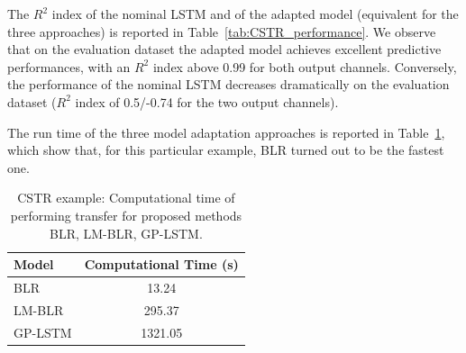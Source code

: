 \documentclass{article}
\begin{document}
 The $R^2$ index of the nominal LSTM and of the adapted model (equivalent for the three approaches) is reported in Table~\ref{tab:CSTR_performance}. We observe that on the evaluation dataset the adapted model achieves excellent predictive performances, with an $R^2$ index above 0.99 for both output channels. 
 Conversely, the performance of the nominal LSTM decreases dramatically on the evaluation dataset ($R^2$ index of 0.5/-0.74 for the two output channels).
  
 The run time of the three model adaptation approaches is reported in Table~\ref{tab:CSTR_comp_time}, which show that, for this particular example, BLR turned out to be the fastest one.  
 
\begin{table}%
\centering
\begin{tabular}{l | c }
\textbf{Model} & \textbf{Computational Time  (s)} \\
\hline
BLR          & 13.24  \\
LM-BLR       & 295.37  \\
GP-LSTM      & 1321.05 \\
\hline
\end{tabular}
\caption{CSTR example: Computational time  of performing transfer for proposed methods BLR, LM-BLR, GP-LSTM. }
\label{tab:CSTR_comp_time}
\end{table} 
\end{document}
